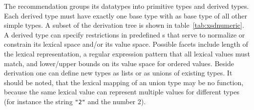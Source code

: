 The recommendation groups its datatypes into primitive types and derived types.
Each derived type must have exactly one base type with  as
base type of all other simple types. A subset of the derivation tree is shown
in table~\ref{tab:xsdnumeric}. A derived type can specify restrictions in 
predefined s that serve to normalize or
constrain its lexical space and/or its value space.  Possible facets include
length of the lexical representation, a regular expression pattern that all
lexical values must match, and lower/upper bounds on its value space for
ordered values.  Beside derivation one can define new types as lists or as
unions of existing types. It should be noted, that the lexical mapping of an union type may be 
no function, because the same lexical value can represent multiple values for
different types (for instance the string \texttt{"2"} and the number 2). 

